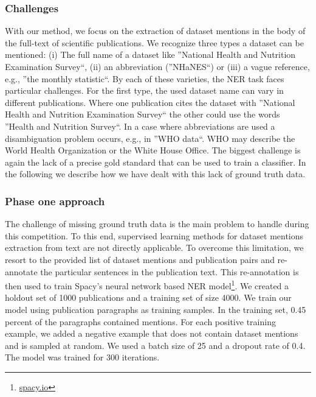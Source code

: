 \subsubsection{Challenges}
With our method, we focus on the extraction of dataset mentions in the body of the full-text of scientific publications. We recognize three types a dataset can be mentioned: (i) The full name of a dataset like ''National Health and Nutrition Examination Survey``, (ii) an abbreviation (''NHaNES``) or (iii) a vague reference, e.g., ''the monthly statistic``. 
By each of these varieties, the NER task faces particular challenges. For the first type, the used dataset name can vary in different publications. Where one publication cites the dataset with ''National Health and Nutrition Examination Survey`` the other could use the words  ''Health and Nutrition Survey``.
In a case where abbreviations are used a disambiguation problem occurs, e.g., in ''WHO data``. WHO may describe the World Health Organization or the White House Office.
The biggest challenge is again the lack of a precise gold standard that can be used to train a classifier.
In the following we describe how we have dealt with this lack of ground truth data.  

\subsubsection{Phase one approach}
The challenge of missing ground truth data is the main problem to handle during this competition. To this end, supervised learning methods for dataset mentions extraction from text are not directly applicable. To overcome this limitation, we resort to the provided list of dataset mentions and publication pairs and re-annotate the particular sentences in the publication text. This re-annotation is then used to train Spacy's neural network based NER model\footnote{\url{spacy.io}}. We created a holdout set of 1000 publications and a training set of size 4000. We train our model using publication paragraphs as training samples. In the training set, 0.45 percent of the paragraphs contained mentions.  For each positive training example, we added a negative example that does not contain dataset mentions and is sampled at random.  
We used a batch size of 25 and a dropout rate of 0.4. The model was trained for 300 iterations.
